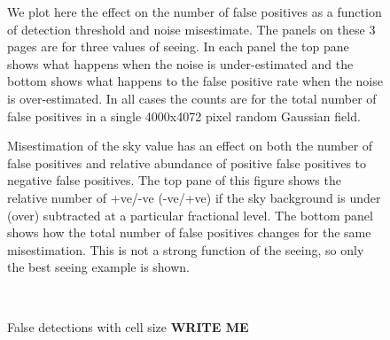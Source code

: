 \documentclass[prd, nofootinbib, floatfix, 11pt,tightenlines,times]{article}
\begin{document}
\begin{figure}
  \centering 
  \caption[]{ We plot here the effect on the number of false positives
    as a function of detection threshold and noise misestimate.  The
    panels on these 3 pages are for three values of seeing.  In each panel the
    top pane shows what happens when the noise is under-estimated and
    the bottom shows what happens to the false positive rate when the
    noise is over-estimated.  In all cases the counts are for the
    total number of false positives in a single 4000x4072 pixel random
    Gaussian field.
    }
  \label{fig-fpthresh}
\end{figure}
\clearpage
\begin{figure}
  \ContinuedFloat 
  \centering 
\end{figure} 
\clearpage
\begin{figure}
  \ContinuedFloat 
  \centering 
\end{figure} 

\begin{figure}
\centering
{}
\caption{
Misestimation of the sky value has an effect on both the number of false positives and relative abundance of positive false positives to negative false positives.
The top pane of this figure shows the relative number of +ve/-ve (-ve/+ve) if the sky background is under (over) subtracted at a particular fractional level.  The 
bottom panel shows how the total number of false positives changes for the same misestimation.  This is not a strong function of the seeing, so only the best
seeing example is shown.
}
\label{fig-skythresh}
\end{figure}

\begin{figure}
 \\
\caption{False detections with cell size {\bf WRITE ME}
}
\label{cellsize}
\end{figure}
\end{document}
